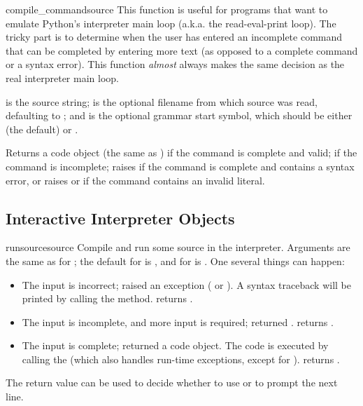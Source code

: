 \begin{funcdesc}{compile_command}{source}
This function is useful for programs that want to emulate Python's
interpreter main loop (a.k.a. the read-eval-print loop).  The tricky
part is to determine when the user has entered an incomplete command
that can be completed by entering more text (as opposed to a
complete command or a syntax error).  This function
\emph{almost} always makes the same decision as the real interpreter
main loop.

 is the source string;  is the optional
filename from which source was read, defaulting to ;
and  is the optional grammar start symbol, which should
be either  (the default) or .

Returns a code object (the same as ) if the command is complete and
valid;  if the command is incomplete; raises
 if the command is complete and contains a
syntax error, or raises  or
 if the command contains an invalid literal.
\end{funcdesc}


\subsection{Interactive Interpreter Objects
            \label{interpreter-objects}}

\begin{methoddesc}[InteractiveInterpreter]{runsource}{source}
Compile and run some source in the interpreter.
Arguments are the same as for ; the
default for  is , and for
 is .  One several things can happen:

\begin{itemize}
\item
The input is incorrect;  raised an
exception ( or ).  A
syntax traceback will be printed by calling the
 method.   returns
.

\item
The input is incomplete, and more input is required;
 returned .
 returns .

\item
The input is complete;  returned a code
object.  The code is executed by calling the  (which
also handles run-time exceptions, except for ).
 returns .
\end{itemize}

The return value can be used to decide whether to use
 or  to prompt the next line.
\end{methoddesc}

